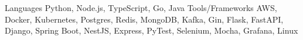 \begin{cvskills}
  \cvskill
  {Languages}
  {Python, Node.js, TypeScript, Go, Java}
  \cvskill
  {Tools/Frameworks}
  {AWS, Docker, Kubernetes, Postgres, Redis, MongoDB, Kafka, Gin, Flask, FastAPI, Django, Spring Boot, NestJS, Express, PyTest, Selenium, Mocha, Grafana, Linux}
\end{cvskills}